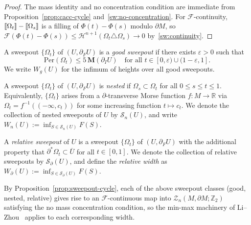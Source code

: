 \begin{proof}
The mass identity and no concentration condition are immediate from Proposition~\ref{prop:cacc-cycle} and~\ref{sw:no-concentration}. For $\mathcal{F}$-continuity, $\llbracket \Omega_t \rrbracket - \llbracket \Omega_s \rrbracket$ is a filling of $\Phi(t) - \Phi(s)$ modulo $\partial M$, so $\mathcal{F}(\Phi(t) - \Phi(s)) \leq \mathcal{H}^{n+1}(\Omega_t \triangle \Omega_s) \to 0$ by~\ref{sw:continuity}.
\end{proof}

\begin{definition}\label{def:good-sweepout}
A sweepout $\{\Omega_t\}$ of $(U, \partial_F U)$ is a \emph{good sweepout} if there exists $\varepsilon > 0$ such that
\[
\mathrm{Per}(\Omega_t) \leq 5\,\mathbf{M}(\partial_I U) \quad \text{for all } t \in [0, \varepsilon) \cup (1-\varepsilon, 1].
\]
We write $W_g(U)$ for the infimum of heights over all good sweepouts.
\end{definition}

\begin{definition}\label{def:nested-sweepout}
A sweepout $\{\Omega_t\}$ of $(U, \partial_F U)$ is \emph{nested} if $\Omega_s \subset \Omega_t$ for all $0 \leq s \leq t \leq 1$. Equivalently, $\{\Omega_t\}$ arises from a $\partial$-transverse Morse function $f: M \to \mathbb{R}$ via $\Omega_t = f^{-1}((-\infty, c_t))$ for some increasing function $t \mapsto c_t$. We denote the collection of nested sweepouts of $U$ by $\mathcal{S}_n(U)$, and write $W_n(U) := \inf_{S \in \mathcal{S}_n(U)} F(S)$.
\end{definition}

\begin{definition}\label{def:relative-sweepout}
A \emph{relative sweepout} of $U$ is a sweepout $\{\Omega_t\}$ of $(U, \partial_F U)$ with the additional property that $\partial^*\Omega_t \subset \overline{U}$ for all $t \in [0,1]$. We denote the collection of relative sweepouts by $\mathcal{S}_\partial(U)$, and define the \emph{relative width} as $W_\partial(U) := \inf_{S \in \mathcal{S}_\partial(U)} F(S)$.
\end{definition}

By Proposition~\ref{prop:sweepout-cycle}, each of the above sweepout classes (good, nested, relative) gives rise to an $\mathcal{F}$-continuous map into $\mathcal{Z}_n(M, \partial M;\mathbb{Z}_2)$ satisfying the no mass concentration condition, so the min-max machinery of Li--Zhou~\cite{LZ17} applies to each corresponding width.

